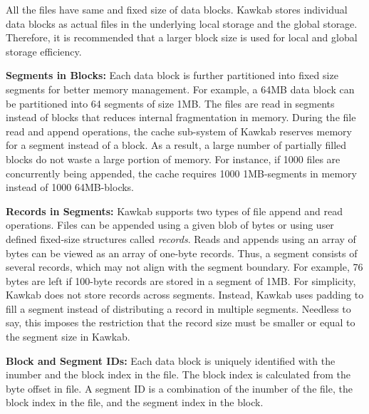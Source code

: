 \documentclass[]{article}
\newcommand{\subtopic}[1]{\vspace{1.5pt} \noindent \textbf{#1}}
\begin{document}
All the files have same and fixed size of data blocks. Kawkab stores
individual data blocks as actual files in the underlying local storage and 
the global storage. Therefore, it is recommended that a larger block
size is used for local and global storage efficiency. 

\subtopic{Segments in Blocks:} Each data block is further partitioned into
fixed size segments for better memory management. For example, a 64MB data
block can be partitioned into 64 segments of size 1MB.  
The files are read in segments instead of blocks that reduces internal
fragmentation in memory.  During the file read and append operations, the cache
sub-system of Kawkab reserves memory for a segment instead of a block. As a
result, a large number of partially filled blocks do not waste a large portion
of memory.  For instance, if 1000 files are concurrently being appended, the
cache requires 1000 1MB-segments in memory instead of 1000 64MB-blocks.



\subtopic{Records in Segments:} Kawkab supports two types of file append and
read operations. Files can be appended using a given blob of bytes or using
user defined fixed-size structures called \textit{records}. Reads and appends
using an array of bytes can be viewed as an array of one-byte records. Thus, a
segment consists of several records, which may not align with the segment
boundary. For example, 76 bytes are left if 100-byte records are stored in a
segment of 1MB. For simplicity, Kawkab does not store records across segments.
Instead, Kawkab uses padding to fill a segment instead of distributing a record
in multiple segments. Needless to say, this imposes the restriction that the
record size must be smaller or equal to the segment size in Kawkab. 


\subtopic{Block and Segment IDs:} Each data block is uniquely identified with
the inumber and the block index in the file.  The block index is calculated
from the byte offset in file.  A segment ID is a combination of the inumber of
the file, the block index in the file, and the segment index in the block.
\end{document}
